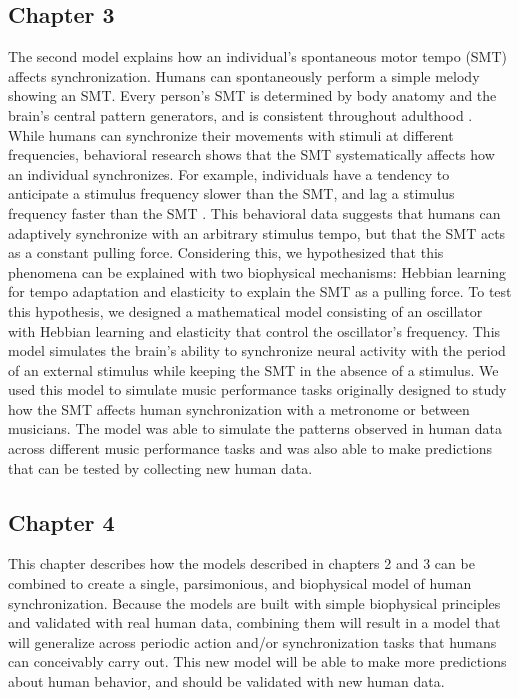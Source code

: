 \documentclass{report}
\begin{document}
\subsection{Chapter 3}
The second model explains how an individual’s spontaneous motor tempo (SMT) affects synchronization. Humans can spontaneously perform a simple melody showing an SMT. Every person’s SMT is determined by body anatomy and the brain's central pattern generators, and is consistent throughout adulthood \cite{scheurich2018tapping}. While humans can synchronize their movements with stimuli at different frequencies, behavioral research shows that the SMT systematically affects how an individual synchronizes. For example, individuals have a tendency to anticipate a stimulus frequency slower than the SMT, and lag a stimulus frequency faster than the SMT \cite{scheurich2018tapping}. This behavioral data suggests that humans can adaptively synchronize with an arbitrary stimulus tempo, but that the SMT acts as a constant pulling force. Considering this, we hypothesized that this phenomena can be explained with two biophysical mechanisms: Hebbian learning for tempo adaptation and elasticity to explain the SMT as a pulling force. To test this hypothesis, we designed a mathematical model consisting of an oscillator with Hebbian learning and elasticity that control the oscillator's frequency. This model simulates the brain's ability to synchronize neural activity with the period of an external stimulus while keeping the SMT in the absence of a stimulus. We used this model to simulate music performance tasks originally designed to study how the SMT affects human synchronization with a metronome or between musicians. The model was able to simulate the patterns observed in human data across different music performance tasks and was also able to make predictions that can be tested by collecting new human data.

\subsection{Chapter 4}
This chapter describes how the models described in chapters 2 and 3 can be combined to create a single, parsimonious, and biophysical model of human synchronization. Because the models are built with simple biophysical principles and validated with real human data, combining them will result in a model that will generalize across periodic action and/or synchronization tasks that humans can conceivably carry out. This new model will be able to make more predictions about human behavior, and should be validated with new human data.
\end{document}
